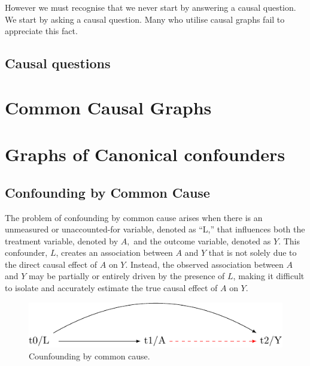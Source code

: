 \documentclass[
  singlecolumn]{report}
\begin{document}
However we must recognise that we never start by answering a causal
question. We start by asking a causal question. Many who utilise causal
graphs fail to appreciate this fact.

\hypertarget{causal-questions}{%
\subsection{Causal questions}\label{causal-questions}}

\hypertarget{common-causal-graphs}{%
\section{Common Causal Graphs}\label{common-causal-graphs}}

\hypertarget{graphs-of-canonical-confounders}{%
\section{Graphs of Canonical
confounders}\label{graphs-of-canonical-confounders}}

\hypertarget{confounding-by-common-cause}{%
\subsection{Confounding by Common
Cause}\label{confounding-by-common-cause}}

The problem of confounding by common cause arises when there is an
unmeasured or unaccounted-for variable, denoted as ``L,'' that
influences both the treatment variable, denoted by \(A,\) and the
outcome variable, denoted as \(Y.\) This confounder, \(L\), creates an
association between \(A\) and \(Y\) that is not solely due to the direct
causal effect of \(A\) on \(Y\). Instead, the observed association
between \(A\) and \(Y\) may be partially or entirely driven by the
presence of \(L\), making it difficult to isolate and accurately
estimate the true causal effect of \(A\) on \(Y\).

\begin{figure}

{\centering \includegraphics[width=1\textwidth,height=\textheight]{causal-dags_files/figure-pdf/fig-dag-common-cause-1.pdf}

}

\caption{\label{fig-dag-common-cause}Counfounding by common cause.}

\end{figure}
\end{document}

